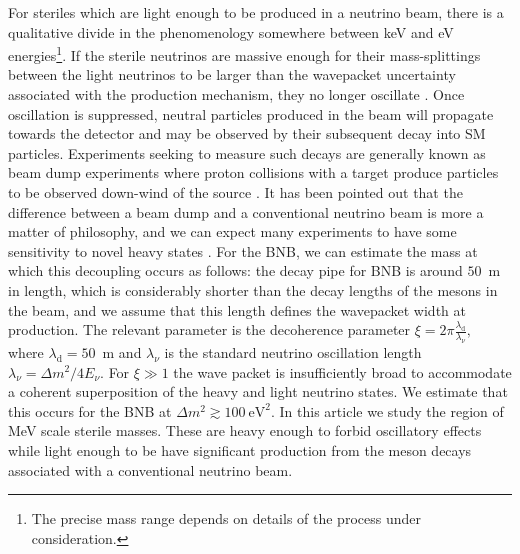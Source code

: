 \documentclass[11pt, a4paper]{article}
\def\ster{\ensuremath N}
\begin{document}
For steriles which are light enough to be produced in a neutrino beam,
%
%
there is a qualitative divide in the phenomenology somewhere between keV and eV
energies\footnote{The precise mass range depends on details of the process
under consideration.}. If the sterile neutrinos are massive enough for their
mass-splittings between the light neutrinos to be larger than the wavepacket
uncertainty associated with the production mechanism, they no longer oscillate
\cite{Akhmedov:2009rb}.  
%
Once oscillation is suppressed, neutral particles produced in the beam will
propagate towards the detector and may be observed by their subsequent decay
into SM particles. Experiments seeking to measure such decays are generally
known as beam dump experiments where proton collisions with a target produce
particles to be observed down-wind of the source \cite{CooperSarkar:1985nh,
Bergsma:1985is, Vaitaitis:1999wq, Bernardi:1985ny, Bernardi:1987ek,
Anelli:2015pba, Alekhin:2015byh}. It has been pointed out that the difference
between a beam dump and a conventional neutrino beam is more a matter of
philosophy, and we can expect many experiments to have some sensitivity to
novel heavy states \cite{Gorbunov:2007ak, Asaka:2012bb, Adams:2013qkq}. 
%
For the BNB, we can estimate the mass at which this decoupling occurs as
follows: the decay pipe for BNB is around $50$~m in length, which is
considerably shorter than the decay lengths of the mesons in the beam, and we
assume that this length defines the wavepacket width at production.  The
relevant parameter is the decoherence parameter \cite{Akhmedov:2009rb,
Hernandez:2011rs}
%
$\xi = 2\pi \frac{\lambda_\text{d}}{\lambda_\nu},$
%
where $\lambda_\text{d} = 50$~m and $\lambda_\nu$ is the standard neutrino
oscillation length $\lambda_\nu = \Delta m^2/4E_\nu$. For $\xi\gg1$ the wave
packet is insufficiently broad to accommodate a coherent superposition of the
heavy and light neutrino states. We estimate that this occurs for the BNB at 
%
$ \Delta m^2 \gtrsim 100~\text{eV}^2.$
%
In this article we study the region of MeV scale sterile masses. These are
heavy enough to forbid oscillatory effects while light enough to be have
significant production from the meson decays associated with a conventional
neutrino beam. 
\end{document}
